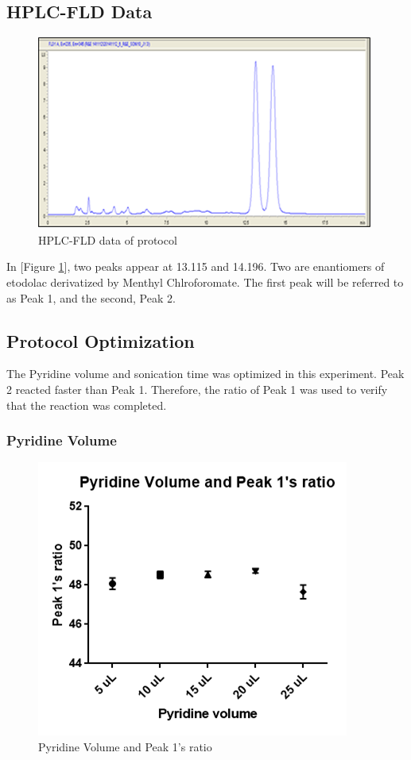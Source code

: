 \documentclass[12pt]{article} %
\begin{document}
\subsection {HPLC-FLD Data}
\begin{figure}[h!]
  \centering
  \includegraphics[width=\linewidth]{fig5.png}
  \caption{HPLC-FLD data of protocol}
  \label{fig:fig5}
\end{figure}

 In [Figure \ref{fig:fig5}], two peaks appear at 13.115 and 14.196. Two are enantiomers of etodolac derivatized by Menthyl Chlroforomate. The first peak will be referred to as Peak 1, and the second, Peak 2.

\subsection{ Protocol Optimization }
 The Pyridine volume and sonication time was optimized in this experiment. Peak 2 reacted faster than Peak 1. Therefore, the ratio of Peak 1 was used to verify that the reaction was completed.

\subsubsection {Pyridine Volume}


\begin{figure}[h!]
  \centering
  \includegraphics[width=0.6\linewidth]{fig6.png}
  \caption{Pyridine Volume and Peak 1's ratio}
  \label{fig:fig6}
\end{figure}
\end{document}
